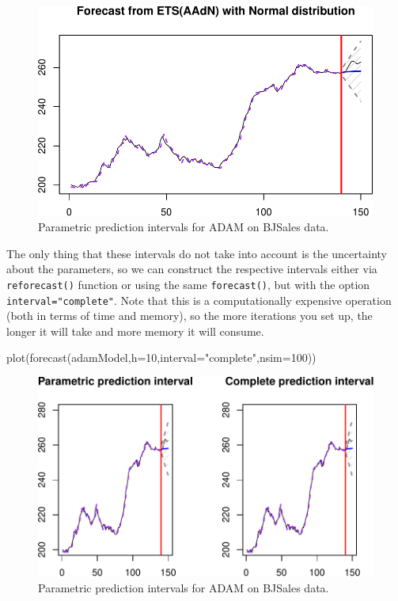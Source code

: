\documentclass[
]{book}
\newenvironment{Shaded}{\begin{snugshade}}{\end{snugshade}}
\newcommand{\AttributeTok}[1]{\textcolor[rgb]{0.77,0.63,0.00}{#1}}
\newcommand{\DecValTok}[1]{\textcolor[rgb]{0.00,0.00,0.81}{#1}}
\newcommand{\FunctionTok}[1]{\textcolor[rgb]{0.00,0.00,0.00}{#1}}
\newcommand{\NormalTok}[1]{#1}
\newcommand{\StringTok}[1]{\textcolor[rgb]{0.31,0.60,0.02}{#1}}
\theoremstyle{definition}
\theoremstyle{definition}
\theoremstyle{definition}
\theoremstyle{definition}
\theoremstyle{remark}
\begin{document}
\begin{figure}
\centering
\includegraphics{adam_files/figure-latex/adamModelPIParam-1.pdf}
\caption{\label{fig:adamModelPIParam}Parametric prediction intervals for ADAM on BJSales data.}
\end{figure}

The only thing that these intervals do not take into account is the uncertainty about the parameters, so we can construct the respective intervals either via \texttt{reforecast()} function or using the same \texttt{forecast()}, but with the option \texttt{interval="complete"}. Note that this is a computationally expensive operation (both in terms of time and memory), so the more iterations you set up, the longer it will take and more memory it will consume.

\begin{Shaded}
\begin{Highlighting}[]
\FunctionTok{plot}\NormalTok{(}\FunctionTok{forecast}\NormalTok{(adamModel,}\AttributeTok{h=}\DecValTok{10}\NormalTok{,}\AttributeTok{interval=}\StringTok{"complete"}\NormalTok{,}\AttributeTok{nsim=}\DecValTok{100}\NormalTok{))}
\end{Highlighting}
\end{Shaded}

\begin{figure}
\centering
\includegraphics{adam_files/figure-latex/adamModelPIComplete-1.pdf}
\caption{\label{fig:adamModelPIComplete}Parametric prediction intervals for ADAM on BJSales data.}
\end{figure}
\end{document}
